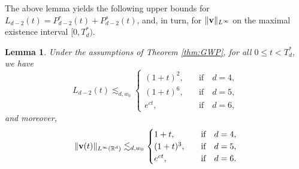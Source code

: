 \documentclass[11pt]{amsart}
\newtheorem{lem}[theorem]{Lemma}
\theoremstyle{definition}
\theoremstyle{remark}
\numberwithin{equation}{section}
\numberwithin{equation}{section}
\newcommand{\nrm}[1]{\Vert#1\Vert}
\newcommand{\0}{\emptyset}
\newcommand{\ift}{\infty}
\newcommand{\bfv}{{\bf v}}
\newcommand{\bbR}{\mathbb R}
\begin{document}
The above lemma yields the following upper bounds for $L_{d-2}(t)=P_{d-2}^{r}(t)+P_{d-2}^{s}(t)$, and, in turn, for $\|\bfv\|_{L^{\infty}}$ on the maximal existence interval $[0,T^*_d)$.
	\begin{lem}\label{lem:Ld-2time} 
		Under the assumptions of Theorem \ref{thm:GWP}, for all $0\le t < T^{*}_d$, we have
		\begin{equation}\label{eq:Ld-2time}
			L_{d-2}(t)\lesssim_{d,w_{0}} \begin{cases}
				(1+t)^{2},&\quad\text{if}\quad d=4,\\
				(1+t)^{6},&\quad\text{if}\quad d=5,\\
				e^{ct},&\quad\text{if}\quad d=6,
			\end{cases}
		\end{equation}
		and moreover,
		\begin{equation}\label{eq:uttime}
			\nrm{\bfv(t)}_{L^{\ift}(\bbR^{d})}\lesssim_{d,w_{0}} \begin{cases}
				1+t,&\quad\text{if}\quad d=4,\\
				(1+t)^{3},&\quad\text{if}\quad d=5,\\
				e^{ct},&\quad\text{if}\quad d=6.
			\end{cases}
		\end{equation}
	\end{lem}
\end{document}
